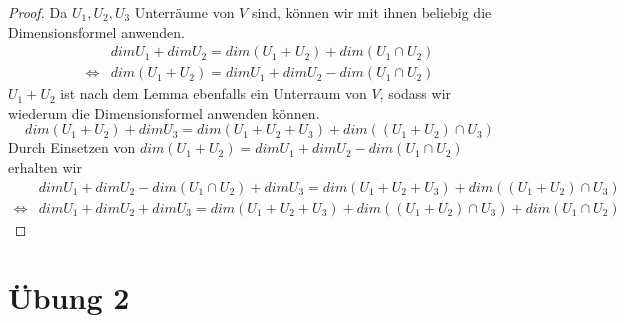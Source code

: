 \documentclass[a4paper,10pt]{article}
\begin{document}
\begin{proof}
 Da $U_1, U_2, U_3$ Unterräume von $V$ sind, können wir mit ihnen beliebig die Dimensionsformel anwenden.
 \begin{align}
  & dim U_1 + dim U_2 = dim(U_1 + U_2) + dim(U_1 \cap U_2)\\
  \Leftrightarrow & dim(U_1 + U_2) = dim U_1 + dim U_2 - dim(U_1 \cap U_2)
 \end{align}
 $U_1 + U_2$ ist nach dem Lemma ebenfalls ein Unterraum von $V$, sodass wir wiederum die Dimensionsformel anwenden können.
 \begin{equation}
  dim(U_1 + U_2) + dim U_3 = dim(U_1 + U_2 + U_3) + dim((U_1 + U_2) \cap U_3)
 \end{equation}
 Durch Einsetzen von $dim(U_1 + U_2) = dim U_1 + dim U_2 - dim(U_1 \cap U_2)$ erhalten wir
 \begin{align}
  & dim U_1 + dim U_2 - dim(U_1 \cap U_2) + dim U_3 = dim(U_1 + U_2 + U_3) + dim((U_1 + U_2) \cap U_3)\\
  \Leftrightarrow & dim U_1 + dim U_2 + dim U_3 = dim(U_1 + U_2 + U_3) + dim((U_1 + U_2) \cap U_3) + dim(U_1 \cap U_2)
 \end{align}
\end{proof}

\section*{Übung 2}
\end{document}
